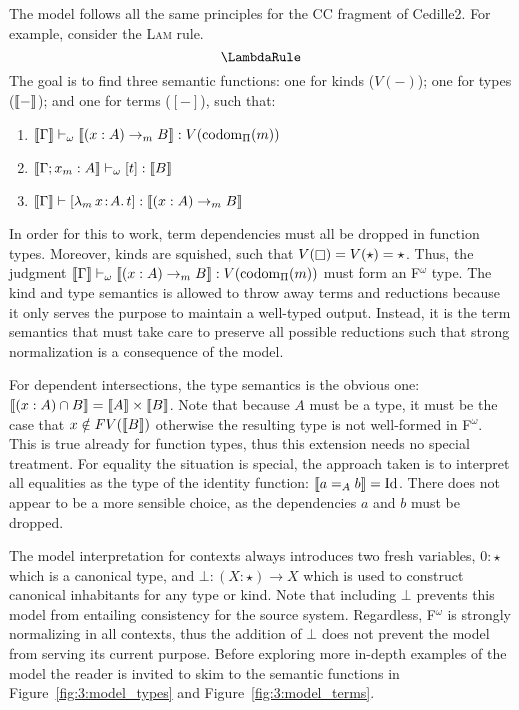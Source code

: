 The model follows all the same principles for the CC fragment of Cedille2.
For example, consider the \textsc{Lam} rule.
$$\LambdaRule$$
The goal is to find three semantic functions: one for kinds ($V(-)$); one for types ($\llbracket - \rrbracket$); and one for terms ($[-]$), such that:
    \begin{enumerate}
        \item $\llbracket \Gamma \rrbracket \vdash_\omega \llbracket (x : A) \to_m B \rrbracket : V(\textnormal{codom}_\Pi(m))$
        \item $\llbracket \Gamma; x_m : A \rrbracket \vdash_\omega [t] : \llbracket B \rrbracket$
        \item $\llbracket \Gamma \rrbracket \vdash [{\lambda_m}\, x\! : \! A.\, t] : \llbracket (x : A) \to_m B \rrbracket$
    \end{enumerate}
In order for this to work, term dependencies must all be dropped in function types.
Moreover, kinds are squished, such that $V(\kind) = V(\star) = \star$.
Thus, the judgment $\llbracket \Gamma \rrbracket \vdash_\omega \llbracket (x : A) \to_m B \rrbracket : V(\textnormal{codom}_\Pi(m))$ must form an F$^\omega$ type.
The kind and type semantics is allowed to throw away terms and reductions because it only serves the purpose to maintain a well-typed output.
Instead, it is the term semantics that must take care to preserve all possible reductions such that strong normalization is a consequence of the model.

For dependent intersections, the type semantics is the obvious one: $\llbracket (x : A) \cap B \rrbracket = \llbracket A \rrbracket \times \llbracket B \rrbracket$.
Note that because $A$ must be a type, it must be the case that $x \notin FV(\llbracket B \rrbracket)$ otherwise the resulting type is not well-formed in F$^\omega$.
This is true already for function types, thus this extension needs no special treatment.
For equality the situation is special, the approach taken is to interpret all equalities as the type of the identity function: $\llbracket a =_A b \rrbracket = \text{Id}$.
There does not appear to be a more sensible choice, as the dependencies $a$ and $b$ must be dropped.



The model interpretation for contexts always introduces two fresh variables, $0 : \star$ which is a canonical type, and $\bot : (X : \star) \to X$ which is used to construct canonical inhabitants for any type or kind.
Note that including $\bot$ prevents this model from entailing consistency for the source system.
Regardless, F$^\omega$ is strongly normalizing in all contexts, thus the addition of $\bot$ does not prevent the model from serving its current purpose.
Before exploring more in-depth examples of the model the reader is invited to skim to the semantic functions in Figure~\ref{fig:3:model_types} and Figure~\ref{fig:3:model_terms}.

